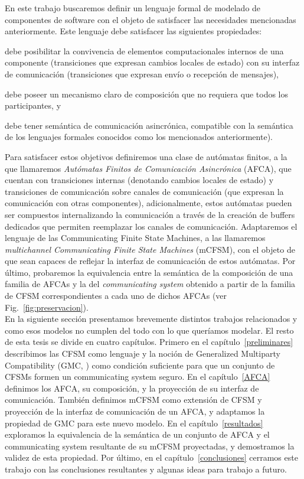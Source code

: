 En este trabajo buscaremos definir un lenguaje formal de modelado de componentes de software con el objeto de satisfacer las necesidades mencionadas anteriormente. Este lenguaje debe satisfacer las siguientes propiedades:
\begin{inparaenum}[1.]
\item debe posibilitar la convivencia de elementos computacionales internos de una componente (transiciones que expresan cambios locales de estado) con su interfaz de comunicación (transiciones que expresan envío o recepción de mensajes),
\item debe poseer un mecanismo claro de composición que no requiera que todos los participantes, y
\item debe tener semántica de comunicación asincrónica, compatible con la semántica de los lenguajes formales conocidos como los mencionados anteriormente).
\end{inparaenum}

Para satisfacer estos objetivos definiremos una clase de autómatas finitos, a la que llamaremos \emph{Autómatas Finitos de Comunicación Asincrónica} (AFCA), que cuentan con transiciones internas (denotando cambios locales de estado) y transiciones de comunicación sobre canales de comunicación (que expresan la comunicación con otras componentes), adicionalmente, estos autómatas pueden ser compuestos internalizando la comunicación a través de la creación de buffers dedicados que permiten reemplazar los canales de comunicación. Adaptaremos el lenguaje de las Communicating Finite State Machines, a las llamaremos \emph{multichannel Communicating Finite State Machines} (mCFSM), con el objeto de que sean capaces de reflejar la interfaz de comunicación de estos autómatas. Por último, probaremos la equivalencia entre la semántica de la composición de una familia de AFCAs y la del \emph{communicating system} obtenido a partir de la familia de CFSM correspondientes a cada uno de dichos AFCAs (ver Fig.~\ref{fig:preservacion}).\\

En la siguiente sección presentamos brevemente distintos trabajos relacionados y como esos modelos no cumplen del todo con lo que queríamos modelar. El resto de esta tesis se divide en cuatro capítulos. Primero en el capítulo~\ref{preliminares} describimos las CFSM como lenguaje y la noción de Generalized Multiparty Compatibility (GMC, \cite{lange:popl15}) como condición suficiente para que un conjunto de CFSMs formen un communicating system seguro. En el capítulo~\ref{AFCA} definimos los AFCA, su composición, y la proyección de su interfaz de comunicación. También definimos mCFSM como extensión de CFSM y proyección de la interfaz de comunicación de un AFCA, y adaptamos la propiedad de GMC para este nuevo modelo. En el capítulo~\ref{resultados} exploramos la equivalencia de la semántica de un conjunto de AFCA y el communicating system resultante de su mCFSM proyectadas, y demostramos la validez de esta propiedad. Por último, en el capítulo~\ref{conclusiones} cerramos este trabajo con las conclusiones resultantes y algunas ideas para trabajo a futuro.



